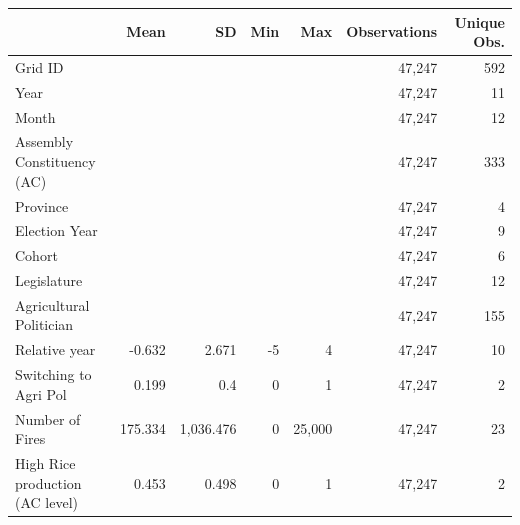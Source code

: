 \begin{tabular}{lrrrrrr}
\toprule
 & Mean & SD & Min & Max & Observations & Unique Obs.\\
\midrule
Grid ID &  &  &  &  & 47,247 & 592\\
Year &  &  &  &  & 47,247 & 11\\
Month &  &  &  &  & 47,247 & 12\\
Assembly Constituency (AC) &  &  &  &  & 47,247 & 333\\
Province &  &  &  &  & 47,247 & 4\\
Election Year &  &  &  &  & 47,247 & 9\\
Cohort &  &  &  &  & 47,247 & 6\\
Legislature &  &  &  &  & 47,247 & 12\\
Agricultural Politician &  &  &  &  & 47,247 & 155\\
Relative year & -0.632 & 2.671 & -5 & 4 & 47,247 & 10\\
Switching to Agri Pol & 0.199 & 0.4 & 0 & 1 & 47,247 & 2\\
Number of Fires & 175.334 & 1,036.476 & 0 & 25,000 & 47,247 & 23\\
High Rice production (AC level) & 0.453 & 0.498 & 0 & 1 & 47,247 & 2\\
\bottomrule
\end{tabular}
